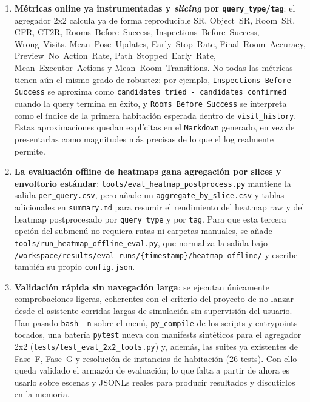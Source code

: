 \begin{enumerate}
  \item \textbf{Métricas online ya instrumentadas y \emph{slicing} por
        \texttt{query\_type}/\texttt{tag}}: el agregador 2x2 calcula ya de forma
        reproducible SR, Object~SR, Room~SR, CFR, CT2R,
        Rooms~Before~Success, Inspections~Before~Success, Wrong~Visits,
        Mean~Pose~Updates, Early~Stop~Rate, Final~Room~Accuracy,
        Preview~No~Action~Rate, Path~Stopped~Early~Rate,
        Mean~Executor~Actions y Mean~Room~Transitions. No todas las métricas
        tienen aún el mismo grado de robustez: por ejemplo,
        \texttt{Inspections Before Success} se aproxima como
        \texttt{candidates\_tried - candidates\_confirmed} cuando la query
        termina en éxito, y \texttt{Rooms Before Success} se interpreta como el
        índice de la primera habitación esperada dentro de \texttt{visit\_history}.
        Estas aproximaciones quedan explícitas en el \texttt{Markdown} generado,
        en vez de presentarlas como magnitudes más precisas de lo que el log
        realmente permite.

  \item \textbf{La evaluación offline de heatmaps gana agregación por slices y
        envoltorio estándar}: \texttt{tools/eval\_heatmap\_postprocess.py}
        mantiene la salida \texttt{per\_query.csv}, pero añade un
        \texttt{aggregate\_by\_slice.csv} y tablas adicionales en
        \texttt{summary.md} para resumir el rendimiento del heatmap raw y del
        heatmap postprocesado por \texttt{query\_type} y por \texttt{tag}. Para
        que esta tercera opción del submenú no requiera rutas ni carpetas
        manuales, se añade \texttt{tools/run\_heatmap\_offline\_eval.py}, que
        normaliza la salida bajo
        \texttt{/workspace/results/eval\_runs/\{timestamp\}/heatmap\_offline/}
        y escribe también su propio \texttt{config.json}.

  \item \textbf{Validación rápida sin navegación larga}: se ejecutan únicamente
        comprobaciones ligeras, coherentes con el criterio del proyecto de no
        lanzar desde el asistente corridas largas de simulación sin supervisión
        del usuario. Han pasado \texttt{bash -n} sobre el menú, \texttt{py\_compile}
        de los scripts y entrypoints tocados, una batería \texttt{pytest} nueva
        con manifests sintéticos para el agregador 2x2
        (\texttt{tests/test\_eval\_2x2\_tools.py}) y, además, las suites ya
        existentes de Fase~F, Fase~G y resolución de instancias de habitación
        (26 tests). Con ello queda validado el armazón de evaluación; lo que
        falta a partir de ahora es usarlo sobre escenas y JSONLs reales para
        producir resultados y discutirlos en la memoria.

\end{enumerate}

